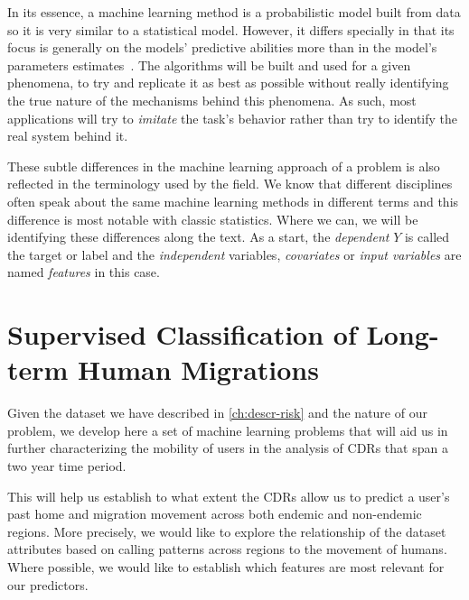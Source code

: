 In its essence, a machine learning method is a probabilistic model built from data so it is very similar to a statistical model.
However, it differs specially in that its focus is generally on the models' predictive abilities more than in the model's parameters estimates~\textcite{breiman-statisticalmodeling}.
The algorithms will be built and used for a given phenomena, to try and replicate it as best as possible without really identifying the true nature of the mechanisms behind this phenomena.
As such, most applications will try to \textit{imitate} the task's behavior rather than try to identify the real system behind it.


These subtle differences in the machine learning approach of a problem is also reflected in the terminology used by the field.
We know that different disciplines often speak about the same machine learning methods in different terms and this difference is most notable with classic statistics.
Where we can, we will be identifying these differences along the text.
As a start, the \textit{dependent} $Y$ is called the target or label and the \textit{independent} variables, \textit{covariates} or \textit{input variables} are named \textit{features} in this case.

\section{Supervised Classification of Long-term Human Migrations}\label{long_term}

Given the dataset we have described in \cref{ch:descr-risk} and the nature of our problem, we develop here a set of machine learning problems that will aid us in further characterizing the mobility of users in the analysis of CDRs that span a two year time period.

This will help us establish to what extent the CDRs allow us to predict a user's past home and migration movement across both endemic and non-endemic regions.
More precisely, we would like to explore the relationship of the dataset attributes based on calling patterns across regions to the movement of humans.
Where possible, we would like to establish which features are most relevant for our predictors.

